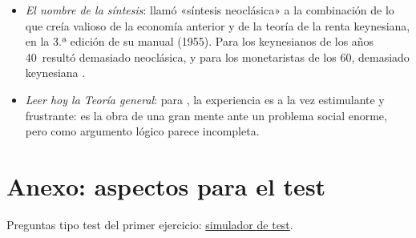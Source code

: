 \documentclass[11pt]{article}
\begin{document}
\begin{anotaciones}
\begin{itemize}
\item \emph{El nombre de la síntesis}:  llamó «síntesis neoclásica» a la combinación de lo que creía valioso de la economía anterior y de la teoría de la renta keynesiana, en la 3.ª edición de su manual (1955). Para los keynesianos de los años 40~resultó demasiado neoclásica, y para los monetaristas de los 60, demasiado keynesiana .
\item \emph{Leer hoy la \emph{Teoría general}}: para \textcite{Mankiw2006Macroeconomist}, la experiencia es a la vez estimulante y frustrante: es la obra de una gran mente ante un problema social enorme, pero como argumento lógico parece incompleta.
\end{itemize}
\end{anotaciones}

\section{Anexo: aspectos para el test}\label{anexo:test}

\begin{anotaciones}
Preguntas tipo test del primer ejercicio: \href{https://www.victorgutierrezmarcos.es/oposicion/temario/primer-ejercicio/test/simulador.html?tema=3.A.4}{simulador de test}.
\end{anotaciones}

\bibliografia
\end{document}
